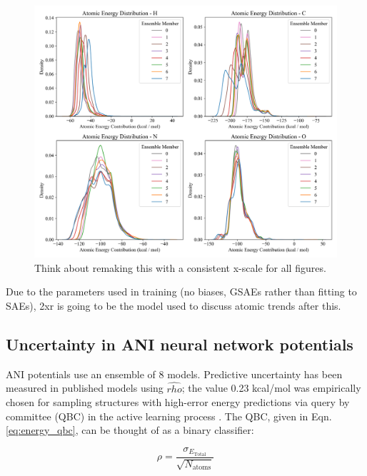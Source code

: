 \begin{figure}[!ht]
    \centering
    \includegraphics[width=1\linewidth]{Images/2xr_outputs/2xr_1x-first_ae-per-model.png}
    \caption{Think about remaking this with a consistent x-scale for all figures.}
    \label{fig:2xr_ae_per_model}
\end{figure}

Due to the parameters used in training (no biases, GSAEs rather than fitting to SAEs), 2xr is going to be the model used to discuss atomic trends after this.

\subsection{Uncertainty in ANI neural network potentials}
\label{subsec:ANI_uncertainty}

ANI potentials use an ensemble of 8 models.
Predictive uncertainty has been measured in published models using $\hat{rho}$; the value 0.23 kcal/mol was empirically chosen for sampling structures with high-error energy predictions via query by committee (QBC) in the active learning process \cite{ani-1x}.
The QBC, given in Eqn. \ref{eq:energy_qbc}, can be thought of as a binary classifier: 

\begin{equation}
\rho = \frac{\sigma_{E_{\text{Total}}}}{\sqrt{N_{\text{atoms}}}}
\label{eq:energy_qbc}
\end{equation}

